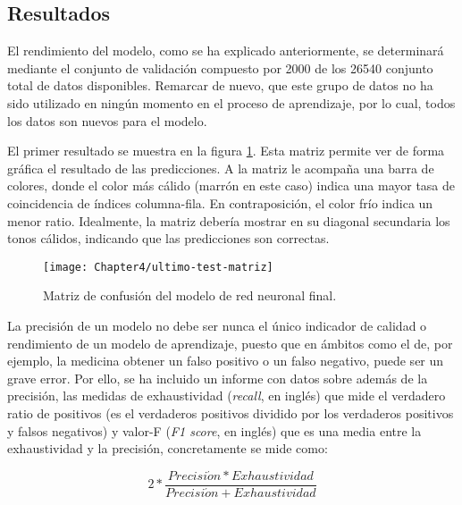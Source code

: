 \subsection{Resultados}
\label{subs:resultados}

El rendimiento del modelo, como se ha explicado anteriormente, se determinará mediante el conjunto de validación
compuesto por 2000 de los 26540 conjunto total de datos disponibles. Remarcar de nuevo, que este grupo de datos no
ha sido utilizado en ningún momento en el proceso de aprendizaje, por lo cual, todos los datos son nuevos para el
modelo.

El primer resultado se muestra en la figura \ref{fig:confusion-matrix}. Esta matriz permite ver de forma gráfica el
resultado de las predicciones. A la matriz le acompaña una barra de colores, donde el color más cálido (marrón en
este caso) indica una mayor tasa de coincidencia de índices columna-fila. En contraposición, el color frío indica
un menor ratio. Idealmente, la matriz debería mostrar en su diagonal secundaria los tonos cálidos, indicando que las predicciones son correctas.


\begin{figure}[htp]
  \centering
    \texttt{[image: Chapter4/ultimo-test-matriz]}
  \caption{Matriz de confusión del modelo de red neuronal final.}
\label{fig:confusion-matrix}
\end{figure}

La precisión de un modelo no debe ser nunca el único indicador de calidad o rendimiento de un modelo de aprendizaje,
puesto que en ámbitos como el de, por ejemplo, la medicina obtener un falso positivo o un falso negativo, puede ser un grave error. Por ello, se ha incluido un informe con datos sobre además de la precisión, las medidas de exhaustividad (\textit{recall}, en inglés) que mide el verdadero ratio de positivos (es el verdaderos positivos dividido por los verdaderos positivos y falsos negativos)  y valor-F (\textit{F1 score}, en inglés) que es una media entre la exhaustividad y la precisión, concretamente se mide como:

\begin{equation}
2*\frac{Precisi\acute{o}n*Exhaustividad}{Precisi\acute{o}n+Exhaustividad}
\end{equation}



